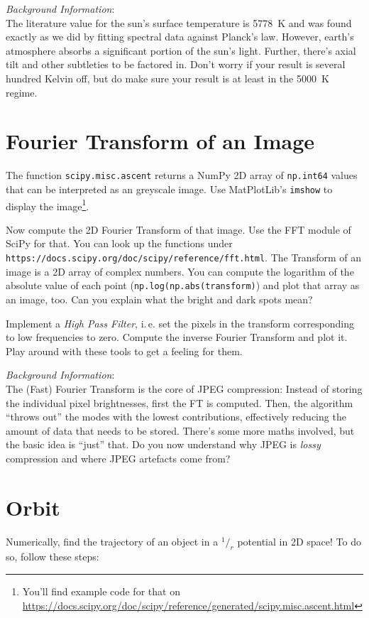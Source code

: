 \documentclass[
	english,
	fontsize=10pt,
	parskip=half,
	titlepage=true,
	DIV=12
]{scrartcl}
\newcommand*{\inPy}[1]{\texttt{#1}}
\newcommand*{\ie}{i.\,e. }
\begin{document}
\emph{Background Information}:\\
The literature value for the sun's surface temperature is \SI{5778}{K} and was found exactly as we did by fitting spectral data against Planck's law. However, earth's atmosphere absorbs a significant portion of the sun's light. Further, there's axial tilt and other subtleties to be factored in. Don't worry if your result is several hundred Kelvin off, but do make sure your result is at least in the \SI{5000}{K} regime.

\section{Fourier Transform of an Image}
The function \texttt{scipy.misc.ascent} returns a NumPy 2D array of \texttt{np.int64} values that can be interpreted as an greyscale image. Use MatPlotLib's \texttt{imshow} to display the image\footnote{You'll find example code for that on \url{https://docs.scipy.org/doc/scipy/reference/generated/scipy.misc.ascent.html}}.

Now compute the 2D Fourier Transform of that image. Use the FFT module of SciPy for that. You can look up the functions under \inPy{https://docs.scipy.org/doc/scipy/reference/fft.html}. The Transform of an image is a 2D array of complex numbers. You can compute the logarithm of the absolute value of each point (\texttt{np.log(np.abs(transform)}) and plot that array as an image, too. Can you explain what the bright and dark spots mean?

Implement a \emph{High Pass Filter}, \ie set the pixels in the transform corresponding to low frequencies to zero. Compute the inverse Fourier Transform and plot it. Play around with these tools to get a feeling for them.

\emph{Background Information}:\\
The (Fast) Fourier Transform is the core of JPEG compression: Instead of storing the individual pixel brightnesses, first the FT is computed. Then, the algorithm \enquote{throws out} the modes with the lowest contributions, effectively reducing the amount of data that needs to be stored. There's some more maths involved, but the basic idea is \enquote{just} that. Do you now understand why JPEG is \emph{lossy} compression and where JPEG artefacts come from?

\section{Orbit}
Numerically, find the trajectory of an object in a $^{1}/_{r}$ potential in 2D space! To do so, follow these steps:
\end{document}
